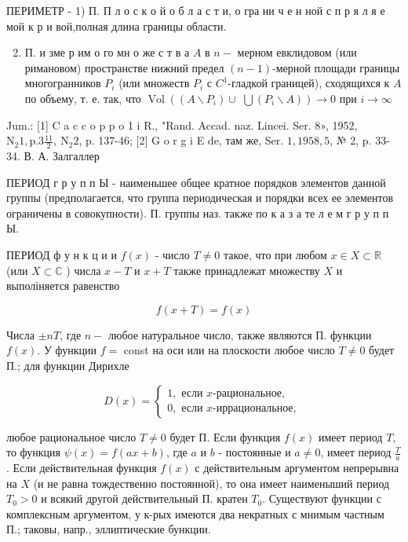 \documentclass[10pt]{article}
\begin{document}
ПЕРИМЕТР - 1) П. П л о с к о й $о$ б л а с т и, о гра ни ч е н ной с п р я л я е мой к р и вой,полная длина границы области.

\begin{enumerate}
  \setcounter{enumi}{1}
  \item П. и зме р им о го мн о же с т в а $A$ в $n-$ мерном евклидовом (или римановом) пространстве нижний предел $(n-1)$-мерной площади границы многогранников $P_{i}$ (или множеств $P_{i}$ с $C^{1}$-гладкой границей), сходящихся к $A$ по объему, т. е. так, что $\operatorname{Vol}\left(\left(A \backslash P_{i}\right) \cup\right.$ $\left.\bigcup\left(P_{i} \backslash A\right)\right) \rightarrow 0$ при $i \rightarrow \infty$
\end{enumerate}

Jum.: [1] C a c c o p p o 1 i R., "Rand. Accad. naz. Lincei. Ser. 8», 1952, $\mathrm{N}_{2} 1, \mathrm{p} .3 \frac{11}{2}, \mathrm{~N}_{2} 2$, p. 137-46; [2] G o r g i E de, там же, Ser. $1,1958,5$, № 2, p. 33-34. В. А. Залгаллер

ПЕРИОД г р у п п Ы - наименьшее общее кратное порядков элементов данной группы (предполагается, что группа периодическая и порядки всех ее элементов ограничены в совокупности). П. группы наз. также по к а з а те л е м г р у п п Ы.

ПЕРИОД ф у н к ц и и $f(x)$ - число $T \neq 0$ такое, что при любом $x \in X \subset \mathbb{R}$ (или $X \subset \mathbb{C}$ ) числа $x-T$ и $x+T$ также принадлежат множеству $X$ и выполіняется равенство

\[
f(x+T)=f(x)
\]

Числа $\pm n T$, где $n-$ любое натуральное число, также являются П. функции $f(x)$. У функции $f=$ const на оси или на плоскости любое число $T \neq 0$ будет П.; для функции Дирихле

\[
D(x)=\left\{\begin{array}{l}
1, \text { если } x \text {-рациональное, } \\
0, \text { если } x \text {-иррациональное, }
\end{array}\right.
\]

любое рациональное число $T \neq 0$ будет П. Если функция $f(x)$ имеет период $T$, то функция $\psi(x)=f(a x+b)$, где $a$ и $b$ - постоянные и $a \neq 0$, имеет период $\frac{T}{a}$. Если действительная функция $f(x)$ с действительным аргументом непрерывна на $X$ (и не равна тождественно постоянной), то она имеет наименыший период $T_{0}>0$ и всякий другой действительный П. кратен $T_{0}$. Существуют функции с комплексным аргументом, у к-рых имеются два некратных с мнимым частным П.; таковы, напр., эллиптические бункции.
\end{document}
